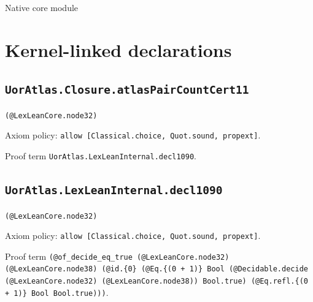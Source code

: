 \documentclass[11pt]{article}
\begin{document}
\begin{center}{\LARGE Native core module}\end{center}
\section*{Kernel-linked declarations}
\subsection*{\texttt{UorAtlas.Closure.atlasPairCountCert11}}
\noindent\texttt{(@LexLeanCore.node32)}\par
\noindent Axiom policy: \texttt{allow [Classical.choice, Quot.sound, propext]}.\par
\noindent Proof term \texttt{UorAtlas.LexLeanInternal.decl1090}.\par
\subsection*{\texttt{UorAtlas.LexLeanInternal.decl1090}}
\noindent\texttt{(@LexLeanCore.node32)}\par
\noindent Axiom policy: \texttt{allow [Classical.choice, Quot.sound, propext]}.\par
\noindent Proof term \texttt{(@of\_decide\_eq\_true (@LexLeanCore.node32) (@LexLeanCore.node38) (@id.\{0\} (@Eq.\{(0 + 1)\} Bool (@Decidable.decide (@LexLeanCore.node32) (@LexLeanCore.node38)) Bool.true) (@Eq.refl.\{(0 + 1)\} Bool Bool.true)))}.\par
\end{document}

